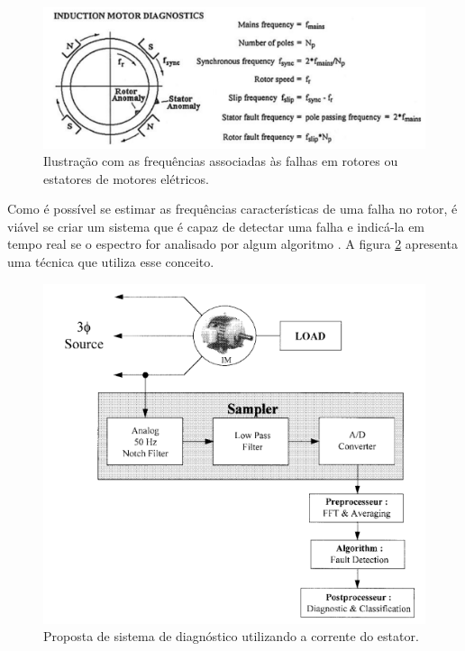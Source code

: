 \begin{figure}[H]
    \caption{Ilustração com as frequências associadas às falhas em rotores ou estatores de motores elétricos.}
    \begin{center}
        \includegraphics[scale=.35]{referencial/img/fault_freq_randall_p55.png}
    \end{center}
    \label{fig:fault_freq_randall_p55}
\end{figure}

Como é possível se estimar as frequências características de uma falha no rotor, é viável se criar um sistema que é capaz de detectar uma 
falha e indicá-la em tempo real se o espectro for analisado por algum algoritmo \cite{El1999}. A figura \ref{fig:current_benbouzid_p3} apresenta uma
técnica que utiliza esse conceito.

\begin{figure}[H]
    \caption{Proposta de sistema de diagnóstico utilizando a corrente do estator.}
    \begin{center}
        \includegraphics[scale=.5]{referencial/img/current_benbouzid_p3.png}
    \end{center}
    \label{fig:current_benbouzid_p3}
\end{figure}

